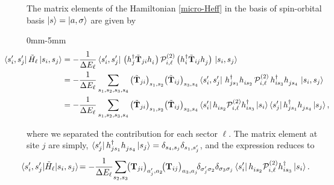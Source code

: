 The matrix elements of the Hamiltonian \eqref{micro-Heff} in the basis of spin-orbital basis $\ket{s}=\ket{a,\sigma}$ are given by
\begin{adjustwidth}{0mm}{-5mm}
\begin{equation}\hspace*{-5mm}
    \begin{split}
        \hspace*{-5mm}\bra{s_i', s_j'} \tilde{ { H } }_{\ell}  \ket{s_i, s_j}
      &= -   \frac{1}{\Delta E_{\ell}} \bra{s_i', s_j'}  \, \big( h_j^\dagger  \tilde{\mathbf{T}}_{ji} h_i^{\phantom{\dagger}} \big) \, \mathcal{P}^{(2)}_{i,\ell} \, \big( h_i^\dagger  \tilde{\mathbf{T}}_{ij} h_j^{\phantom{\dagger}} \big)\, \ket{s_i, s_j} \;
      \\
      &= -   \frac{1}{\Delta E_{\ell}} \sum_{s_1,s_2,s_3,s_4}\big(\tilde{\mathbf{T}}_{ji} \big)_{s_1,s_2}\big(  \tilde{\mathbf{T}}_{ij}\big)_{s_3,s_4}   \bra{s_i', s_j'}  \,  h_{js_1}^\dagger   h_{is_2}^{\phantom{\dagger}} \, \mathcal{P}^{(2)}_{i,\ell} \, h_{is_3}^\dagger h_{js_4}^{\phantom{\dagger}} \, \ket{s_i, s_j}  \\
      &= -   \frac{1}{\Delta E_{\ell}} \sum_{s_1,s_2,s_3,s_4}\big(\tilde{\mathbf{T}}_{ji} \big)_{s_1,s_2}\big(  \tilde{\mathbf{T}}_{ij}\big)_{s_3,s_4}
      \bra{s_i'}    h_{is_2}^{\phantom{\dagger}} \mathcal{P}^{(2)}_{i,\ell}  h_{is_3}^\dagger  \ket{s_i}
      \bra{s_j'}    h_{js_1}^\dagger   h_{js_4}^{\phantom{\dagger}} \ket{s_j}
   ,
    \end{split}
\end{equation}\end{adjustwidth}
where we separated the contribution for each sector $\ell$.
The matrix element at site $j$ are simply, $
    \bra{s_j'}    h_{js_1}^\dagger   h_{js_4}^{\phantom{\dagger}} \ket{s_j}  =
    \delta_{s_4,s_j}\delta_{s_1,s_j' } $, and the expression reduces to
\begin{equation}
    \begin{split}\hspace*{-8mm}
        \bra{s_i', s_j'}\! \tilde{ { H } }_{\ell} \!\ket{s_i, s_j} \!
      &= -   \frac{1}{\Delta E_{\ell}} \!
      \sum_{s_2,s_3}\!\!\big({\mathbf{T}}_{ji} \big)_{ {a}_j', {a}_2}\!\big(  {\mathbf{T}}_{ij}\big)_{ {a}_3,{a}_j}\!\delta_{\sigma_j'\sigma_2} \delta_{\sigma_3\sigma_j}
      \bra{s_i'}    h_{is_2}^{\phantom{\dagger}} \mathcal{P}^{(2)}_{i,\ell}  h_{is_3}^\dagger  \ket{s_i}                .\hspace*{-1mm}
    \end{split}
\end{equation}
